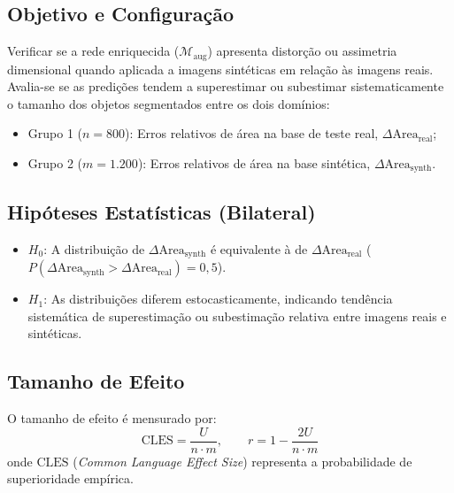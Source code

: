 \documentclass[11pt,a4paper]{article}
\begin{document}
\subsection{Objetivo e Configuração}
Verificar se a rede enriquecida ($\mathcal{M}_{\text{aug}}$) apresenta distorção ou assimetria dimensional quando aplicada a imagens sintéticas em relação às imagens reais. Avalia-se se as predições tendem a superestimar ou subestimar sistematicamente o tamanho dos objetos segmentados entre os dois domínios:
\begin{itemize}
    \item Grupo 1 ($n = 800$): Erros relativos de área na base de teste real, $\Delta\text{Area}_{\text{real}}$;
    \item Grupo 2 ($m = 1.200$): Erros relativos de área na base sintética, $\Delta\text{Area}_{\text{synth}}$.
\end{itemize}

\subsection{Hipóteses Estatísticas (Bilateral)}
\begin{itemize}
    \item $H_0$: A distribuição de $\Delta\text{Area}_{\text{synth}}$ é equivalente à de $\Delta\text{Area}_{\text{real}}$ ($P(\Delta\text{Area}_{\text{synth}} > \Delta\text{Area}_{\text{real}}) = 0{,}5$).
    \item $H_1$: As distribuições diferem estocasticamente, indicando tendência sistemática de superestimação ou subestimação relativa entre imagens reais e sintéticas.
\end{itemize}

\subsection{Tamanho de Efeito}
O tamanho de efeito é mensurado por:
\begin{equation}
\text{CLES} = \frac{U}{n \cdot m}, \qquad r = 1 - \frac{2U}{n \cdot m}
\end{equation}
onde $\text{CLES}$ (\textit{Common Language Effect Size}) representa a probabilidade de superioridade empírica.
\end{document}
